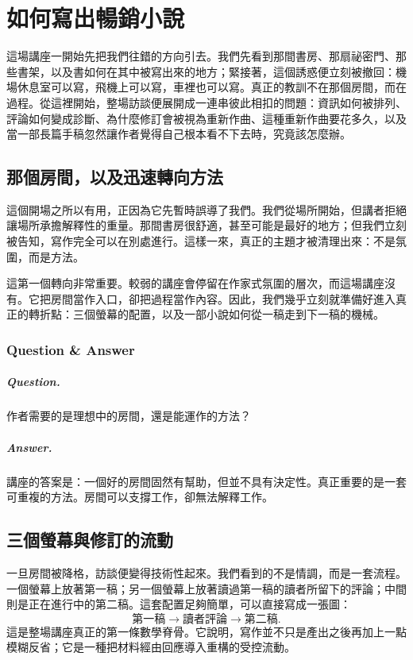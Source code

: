 \chapter{如何寫出暢銷小說}

這場講座一開始先把我們往錯的方向引去。我們先看到那間書房、那扇祕密門、那些書架，以及書如何在其中被寫出來的地方；緊接著，這個誘惑便立刻被撤回：機場休息室可以寫，飛機上可以寫，車裡也可以寫。真正的教訓不在那個房間，而在過程。從這裡開始，整場訪談便展開成一連串彼此相扣的問題：資訊如何被排列、評論如何變成診斷、為什麼修訂會被視為重新作曲、這種重新作曲要花多久，以及當一部長篇手稿忽然讓作者覺得自己根本看不下去時，究竟該怎麼辦。

\section{那個房間，以及迅速轉向方法}

這個開場之所以有用，正因為它先暫時誤導了我們。我們從場所開始，但講者拒絕讓場所承擔解釋性的重量。那間書房很舒適，甚至可能是最好的地方；但我們立刻被告知，寫作完全可以在別處進行。這樣一來，真正的主題才被清理出來：不是氛圍，而是方法。

這第一個轉向非常重要。較弱的講座會停留在作家式氛圍的層次，而這場講座沒有。它把房間當作入口，卻把過程當作內容。因此，我們幾乎立刻就準備好進入真正的轉折點：三個螢幕的配置，以及一部小說如何從一稿走到下一稿的機械。

\subsection{Question \& Answer}

\paragraph{Question.} 作者需要的是理想中的房間，還是能運作的方法？

\paragraph{Answer.} 講座的答案是：一個好的房間固然有幫助，但並不具有決定性。真正重要的是一套可重複的方法。房間可以支撐工作，卻無法解釋工作。

\section{三個螢幕與修訂的流動}

一旦房間被降格，訪談便變得技術性起來。我們看到的不是情調，而是一套流程。一個螢幕上放著第一稿；另一個螢幕上放著讀過第一稿的讀者所留下的評論；中間則是正在進行中的第二稿。這套配置足夠簡單，可以直接寫成一張圖：
\begin{equation}
\text{第一稿} \to \text{讀者評論} \to \text{第二稿}.
\end{equation}
這是整場講座真正的第一條數學脊骨。它說明，寫作並不只是產出之後再加上一點模糊反省；它是一種把材料經由回應導入重構的受控流動。

